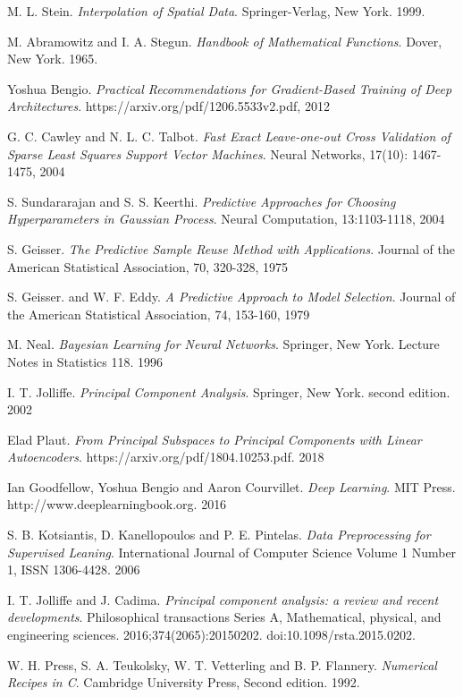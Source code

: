 \documentclass[11pt,a4paper]{article}
\theoremstyle{definition}
\numberwithin{equation}{section}
\begin{document}
\begin{thebibliography}{11}
	M. L. Stein.
	\textit{Interpolation of Spatial Data}. 
	Springer-Verlag, New York. 1999.
	
	M. Abramowitz and I. A. Stegun.
	\textit{Handbook of Mathematical Functions}. 
	Dover, New York. 1965.
	
	Yoshua Bengio.
	\textit{Practical Recommendations for Gradient-Based Training of Deep Architectures}. 
	https://arxiv.org/pdf/1206.5533v2.pdf, 2012
	
	G. C. Cawley and N. L. C. Talbot.
	\textit{Fast Exact Leave-one-out Cross Validation of Sparse Least Squares Support Vector Machines}. 
	Neural Networks, 17(10): 1467-1475, 2004
	
	S. Sundararajan and S. S. Keerthi.
	\textit{Predictive Approaches for Choosing Hyperparameters in Gaussian Process}. 
	Neural Computation, 13:1103-1118, 2004
	
	S. Geisser.
	\textit{The Predictive Sample Reuse Method with Applications}. 
	Journal of the American Statistical Association, 70, 320-328, 1975
	
	S. Geisser. and W. F. Eddy.
	\textit{A Predictive Approach to Model Selection}. 
	Journal of the American Statistical Association, 74, 153-160, 1979
	
	M. Neal.
	\textit{Bayesian Learning for Neural Networks}. 
	Springer, New York. Lecture Notes in Statistics 118. 1996
	
	I. T. Jolliffe.
	\textit{Principal Component Analysis}. 
	Springer, New York. second edition. 2002
	
	Elad Plaut.
	\textit{From Principal Subspaces to Principal Components with Linear Autoencoders}. 
	https://arxiv.org/pdf/1804.10253.pdf. 2018
	
	Ian Goodfellow, Yoshua Bengio and Aaron Courvillet.
	\textit{Deep Learning}. 
	MIT Press. http://www.deeplearningbook.org. 2016
	
	S. B. Kotsiantis, D. Kanellopoulos and P. E. Pintelas.
	\textit{Data Preprocessing for Supervised Leaning}. 
	International Journal of Computer Science Volume 1 Number 1, ISSN 1306-4428. 2006
			
	
	I. T. Jolliffe and J. Cadima. 
	\textit{Principal component analysis: a review and recent developments}. 
	Philosophical transactions Series A, Mathematical, physical, and engineering sciences. 2016;374(2065):20150202. doi:10.1098/rsta.2015.0202.
	
	W. H. Press, S. A. Teukolsky, W. T. Vetterling and B. P. Flannery. 
	\textit{Numerical Recipes in C}. 
	Cambridge University Press, Second edition. 1992.
	
\end{thebibliography}
\newpage
\end{document}
